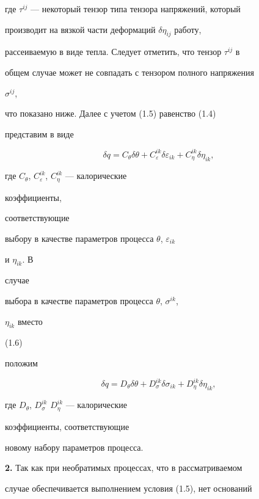 где $\tau^{ij}$ --- некоторый тензор типа тензора напряжений, который


производит на вязкой части деформаций $\delta\eta_{ij}$ работу,


рассеиваемую в виде тепла. Следует отметить, что тензор $\tau^{ij}$ в


общем случае может не совпадать с тензором полного напряжения


$\sigma^{ij}$,


что показано ниже. Далее с учетом (1.5) равенство (1.4)


представим в виде


\begin{equation}


\delta q=C_\theta\delta\theta+C^{ik}_\varepsilon\delta\varepsilon_{ik}+


C^{ik}_\eta\delta\eta_{ik},\tag{1.6}


\end{equation}


где $C_\theta$, $C^{ik}_\varepsilon$, $C^{ik}_\eta$ --- калорические


коэффициенты,


соответствующие


выбору в качестве параметров процесса $\theta$, $\varepsilon_{ik}$


и $\eta_{ik}$. В


случае


выбора в качестве параметров процесса $\theta$, $\sigma^{ik}$,


$\eta_{ik}$ вместо


(1.6)


положим


$$


\delta q=D_\theta\delta\theta+D^{ik}_\sigma\delta\sigma_{ik}+


D^{ik}_\eta\delta\eta_{ik},


$$


где $D_\theta$, $D^{ik}_\sigma$ $D^{ik}_\eta$ --- калорические


коэффициенты, соответствующие


новому набору параметров процесса.


\medskip





{\bf 2.} Так как при необратимых процессах, что в рассматриваемом


случае обеспечивается выполнением условия (1.5), нет оснований


